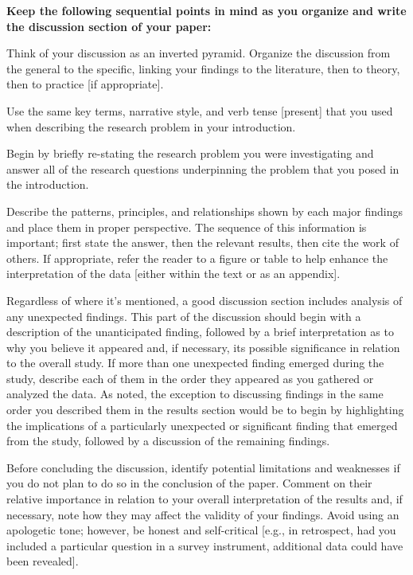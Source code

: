 \textbf{Keep the following sequential points in mind as you organize and write the discussion section of your paper:}

Think of your discussion as an inverted pyramid. Organize the discussion from the general to the specific, linking your findings to the literature, then to theory, then to practice [if appropriate].

Use the same key terms, narrative style, and verb tense [present] that you used when describing the research problem in your introduction.

Begin by briefly re-stating the research problem you were investigating and answer all of the research questions underpinning the problem that you posed in the introduction.

Describe the patterns, principles, and relationships shown by each major findings and place them in proper perspective. The sequence of this information is important; first state the answer, then the relevant results, then cite the work of others. If appropriate, refer the reader to a figure or table to help enhance the interpretation of the data [either within the text or as an appendix].

Regardless of where it's mentioned, a good discussion section includes analysis of any unexpected findings. This part of the discussion should begin with a description of the unanticipated finding, followed by a brief interpretation as to why you believe it appeared and, if necessary, its possible significance in relation to the overall study. If more than one unexpected finding emerged during the study, describe each of them in the order they appeared as you gathered or analyzed the data. As noted, the exception to discussing findings in the same order you described them in the results section would be to begin by highlighting the implications of a particularly unexpected or significant finding that emerged from the study, followed by a discussion of the remaining findings.

Before concluding the discussion, identify potential limitations and weaknesses if you do not plan to do so in the conclusion of the paper. Comment on their relative importance in relation to your overall interpretation of the results and, if necessary, note how they may affect the validity of your findings. Avoid using an apologetic tone; however, be honest and self-critical [e.g., in retrospect, had you included a particular question in a survey instrument, additional data could have been revealed].

